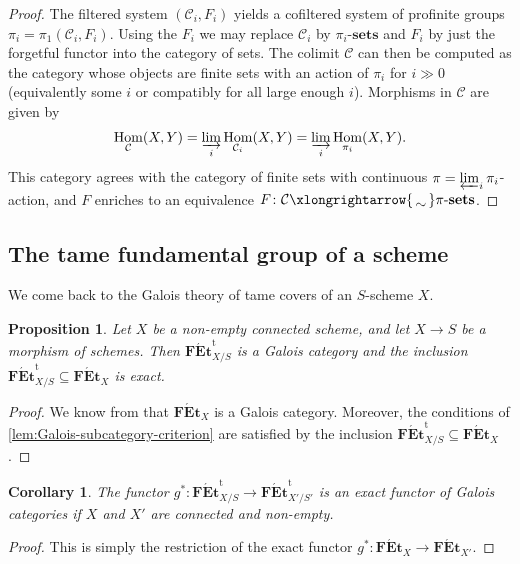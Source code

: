 \documentclass[a4paper,twoside,11pt,reqno]{amsart}
\newcommand{\cC}{{\mathcal C}}
\newcommand{\isomto}{\xlongrightarrow{\,\smash{\raisebox{-0.65ex} 
    {\ensuremath{\displaystyle\sim}}}\,}}
\DeclareMathOperator{\Hom}{Hom}
\newcommand{\cat}[1]{\mathbf{#1}}
\newcommand{\FEt}{\cat{F\acute{E}t}}
\newcommand{\sets}{\cat{sets}} %
\newcommand{\stacks}[2][Tag]{\cite[\href{https://stacks.math.columbia.edu/tag/#2}{#1~#2}]{StacksProject}}
\newcommand{\FEtt}{{\cat{F\acute{E}t}}^{\!\mathrm{t}}}
\newtheorem{prop}[thm]{Proposition}
\newtheorem{cor}[thm]{Corollary}
\theoremstyle{definition}
\numberwithin{equation}{subsection}
\begin{document}
\begin{proof}
    The filtered system $(\cC_i,F_i)$ yields a cofiltered system of profinite groups 
    $\pi_i = \pi_1(\cC_i,F_i)$. Using the $F_i$ we may replace $\cC_i$ by $\pi_i$-$\sets$ and $F_i$ by just the forgetful functor into the category of sets. The colimit $\cC$ can then be computed as the category whose objects are finite sets with an action of $\pi_i$ for $i \gg 0$ (equivalently some $i$ or compatibly for all large enough $i$). Morphisms in $\cC$ are given by 
    \[
    \Hom_{\cC}(X,Y) = \varinjlim_i \Hom_{\cC_i}(X,Y)= \varinjlim_i \Hom_{\pi_i}(X,Y).
    \]
    This category agrees with the category of finite sets with continuous $\pi = \varprojlim_i \pi_i$-action, and $F$ enriches to an equivalence $F \colon \cC \isomto \pi\text{-}\sets$.  
\end{proof}


\subsection{The tame fundamental group of a scheme}
\label{sec:tame pi1}

We come back to the Galois theory of tame covers of an $S$-scheme $X$.

\begin{prop}
\label{prop:Fett is Galois for schemes}
    Let $X$ be a non-empty connected scheme, and let $X\to S$ be a morphism of schemes. Then $\FEtt_{X/S}$ is a Galois category and the inclusion $\FEtt_{X/S} \subseteq \FEt_X$ is exact.
\end{prop}

\begin{proof}
We know from \stacks[Lemma]{0BNB} that $\FEt_X$ is a Galois category. Moreover, the conditions of \cref{lem:Galois-subcategory-criterion} are satisfied by the inclusion $\FEtt_{X/S}\subseteq \FEt_X$. 
\end{proof}

\begin{cor}
\label{cor:exact functor tame covers}
    The functor $g^\ast \colon \FEtt_{X/S} \to \FEtt_{X'/S'}$  
    is an exact functor of Galois categories if $X$ and $X'$ are connected and non-empty.
\end{cor}

\begin{proof}
    This is simply the restriction of the exact functor $g^\ast \colon \FEt_X \to \FEt_{X'}$.
\end{proof}
\end{document}
